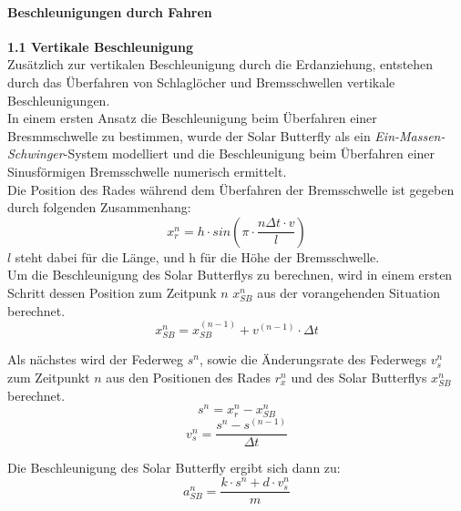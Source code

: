   \paragraph{Beschleunigungen durch Fahren}
  \begin{description}
    \item \textbf{1.1 Vertikale Beschleunigung}\\
    Zusätzlich zur vertikalen Beschleunigung durch die Erdanziehung, entstehen durch das Überfahren von Schlaglöcher und Bremsschwellen vertikale Beschleunigungen.\\
    In einem ersten Ansatz die Beschleunigung beim Überfahren einer Bresmmschwelle zu bestimmen, wurde der Solar Butterfly als ein \emph{Ein-Massen-Schwinger}-System modelliert und die Beschleunigung beim Überfahren einer Sinusförmigen Bremsschwelle numerisch ermittelt.\\

    Die Position des Rades während dem Überfahren der Bremsschwelle ist gegeben durch folgenden Zusammenhang:
    \begin{equation}
      x_r^n = h \cdot sin\left(\pi \cdot \frac{n\Delta t \cdot v}{l}\right)
    \end{equation}
    $l$ steht dabei für die Länge, und h für die Höhe der Bremsschwelle.\\

    Um die Beschleunigung des Solar Butterflys zu berechnen, wird in einem ersten Schritt dessen Position zum Zeitpunk $n$ $x_{SB}^n$ aus der vorangehenden Situation berechnet.
    \begin{equation}
      x_{SB}^n = x_{SB}^{(n-1)} + v^{(n-1)} \cdot \Delta t
    \end{equation}

    Als nächstes wird der Federweg $s^n$, sowie die Änderungsrate des Federwegs $v_s^n$ zum Zeitpunkt $n$ aus den Positionen des Rades $r_x^n$ und des Solar Butterflys $x_{SB}^n$ berechnet.
    \begin{equation}
      s^n = x_r^n - x_{SB}^n
    \end{equation}
    \begin{equation}
      v_s^n = \frac{s^n - s^{(n-1)}}{\Delta t}
    \end{equation}

    Die Beschleunigung des Solar Butterfly ergibt sich dann zu:\\
    \begin{equation}
      a_{SB}^n = \frac{k \cdot s^n + d \cdot v_s^n}{m}
    \end{equation}


\end{description}

